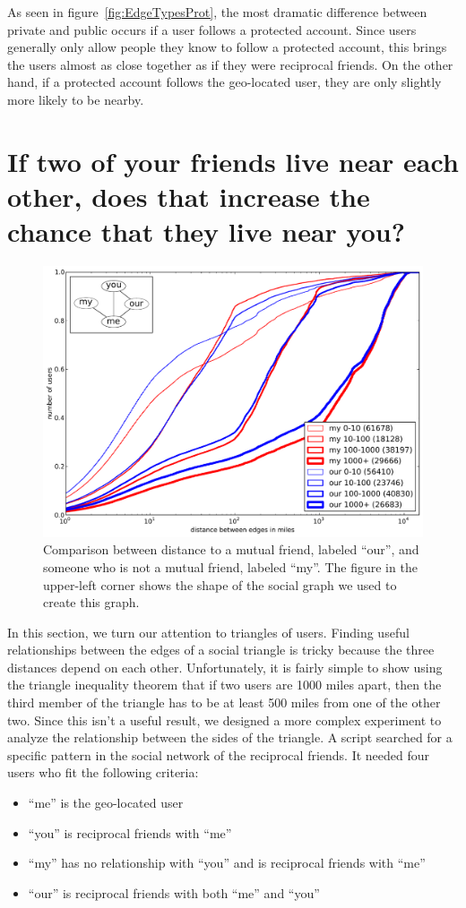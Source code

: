 As seen in figure~\ref{fig:EdgeTypesProt}, the most dramatic difference between
private and public occurs if a user follows a protected account.
%
Since users generally only allow people they know to follow a protected
account, this brings the users almost as close together as if they were
reciprocal friends.
%
On the other hand, if a protected account follows the geo-located user, they
are only slightly more likely to be nearby.

\section{If two of your friends live near each other, does that increase the
chance that they live near you?}

\begin{figure}[tb]
\centering
\includegraphics[width=\linewidth]{figures/near_triads.pdf}
\caption{
Comparison between distance to a mutual friend, labeled ``our'', and someone
who is not a mutual friend, labeled ``my''.
The figure in the upper-left corner shows the shape of the social graph we used
to create this graph.
}
\label{fig:NearTriads}
\end{figure}

In this section, we turn our attention to triangles of users.
Finding useful relationships between the edges of a social triangle is tricky
because the three distances depend on each other.
Unfortunately, it is fairly simple to show using the triangle inequality theorem
that if two users are 1000 miles apart, then the third member of the triangle
has to be at least 500 miles from one of the other two.
Since this isn't a useful result, we designed a more complex experiment to
analyze the relationship between the sides of the triangle.
A script searched for a specific pattern in the social network of the
reciprocal friends.  It needed four users who fit the following criteria:
\begin{itemize}
\item ``me'' is the geo-located user
\item ``you'' is reciprocal friends with ``me''
\item ``my'' has no relationship with ``you'' and is reciprocal friends with ``me''
\item ``our'' is reciprocal friends with both ``me'' and ``you''
\end{itemize}

